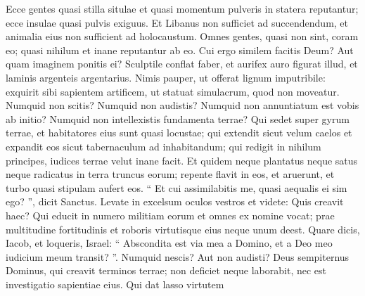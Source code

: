 \begin{biblechapter}
\begin{biblechapter}
\begin{biblechapter}
\begin{biblechapter}
\begin{biblechapter}
\begin{biblechapter}
\begin{biblechapter}
\begin{biblechapter}
\begin{biblechapter}
\begin{biblechapter}
\begin{biblechapter}
\begin{biblechapter}
\begin{biblechapter}
\begin{biblechapter}
\begin{biblechapter}
\begin{biblechapter}
\begin{biblechapter}
\begin{biblechapter}
\begin{biblechapter}
\begin{biblechapter}
\begin{biblechapter}
\begin{biblechapter}
\begin{biblechapter}
\begin{biblechapter}
\begin{biblechapter}
\begin{biblechapter}
\begin{biblechapter}
\begin{biblechapter}
\begin{biblechapter}
\begin{biblechapter}
\begin{biblechapter}
\begin{biblechapter}
\begin{biblechapter}
\begin{biblechapter}
\begin{biblechapter}
\begin{biblechapter}
\begin{biblechapter}
\begin{biblechapter}
\begin{biblechapter}
\begin{biblechapter}
 \verse Ecce gentes quasi stilla situlae
 et quasi momentum pulveris in statera reputantur;
 ecce insulae quasi pulvis exiguus.
 \verse Et Libanus non sufficiet ad succendendum,
 et animalia eius non sufficient ad holocaustum.
 \verse Omnes gentes, quasi non sint, coram eo;
 quasi nihilum et inane reputantur ab eo.
 \verse Cui ergo similem facitis Deum?
 Aut quam imaginem ponitis ei?
 \verse Sculptile conflat faber,
 et aurifex auro figurat illud,
 et laminis argenteis argentarius.
 \verse Nimis pauper, ut offerat lignum imputribile:
 exquirit sibi sapientem artificem,
 ut statuat simulacrum,
 quod non moveatur.
 \verse Numquid non scitis? Numquid non audistis?
 Numquid non annuntiatum est vobis ab initio?
 Numquid non intellexistis fundamenta terrae?
 \verse Qui sedet super gyrum terrae,
 et habitatores eius sunt quasi locustae;
 qui extendit sicut velum caelos
 et expandit eos sicut tabernaculum ad inhabitandum;
 \verse qui redigit in nihilum principes,
 iudices terrae velut inane facit.
 \verse Et quidem neque plantatus neque satus
 neque radicatus in terra truncus eorum;
 repente flavit in eos, et aruerunt,
 et turbo quasi stipulam aufert eos.
 \verse “ Et cui assimilabitis me,
 quasi aequalis ei sim ego? ”,
 dicit Sanctus.
 \verse Levate in excelsum oculos vestros
 et videte: Quis creavit haec?
 Qui educit in numero militiam eorum
 et omnes ex nomine vocat;
 prae multitudine fortitudinis et roboris virtutisque eius
 neque unum deest.
 \verse Quare dicis, Iacob,
 et loqueris, Israel:
 “ Abscondita est via mea a Domino,
 et a Deo meo iudicium meum transit? ”.
 \verse Numquid nescis? Aut non audisti?
 Deus sempiternus Dominus,
 qui creavit terminos terrae;
 non deficiet neque laborabit,
 nec est investigatio sapientiae eius. 
\verse Qui dat lasso virtutem

\end{biblechapter}
\end{biblechapter}
\end{biblechapter}
\end{biblechapter}
\end{biblechapter}
\end{biblechapter}
\end{biblechapter}
\end{biblechapter}
\end{biblechapter}
\end{biblechapter}
\end{biblechapter}
\end{biblechapter}
\end{biblechapter}
\end{biblechapter}
\end{biblechapter}
\end{biblechapter}
\end{biblechapter}
\end{biblechapter}
\end{biblechapter}
\end{biblechapter}
\end{biblechapter}
\end{biblechapter}
\end{biblechapter}
\end{biblechapter}
\end{biblechapter}
\end{biblechapter}
\end{biblechapter}
\end{biblechapter}
\end{biblechapter}
\end{biblechapter}
\end{biblechapter}
\end{biblechapter}
\end{biblechapter}
\end{biblechapter}
\end{biblechapter}
\end{biblechapter}
\end{biblechapter}
\end{biblechapter}
\end{biblechapter}
\end{biblechapter}
